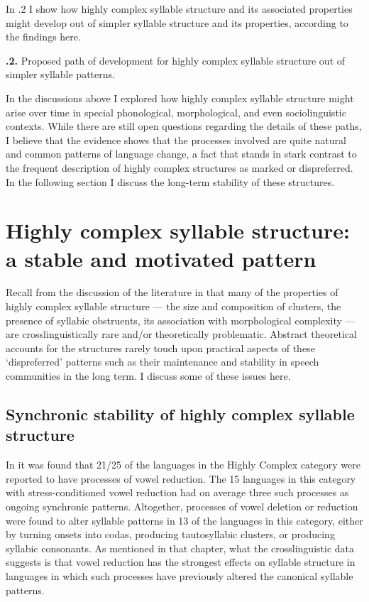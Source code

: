   In .2 I show how highly complex syllable structure and its associated properties might develop out of simpler syllable structure and its properties, according to the findings here.


\textbf{.2.} Proposed path of development for highly complex syllable structure out of simpler syllable patterns.

  In the discussions above I explored how highly complex syllable structure might arise over time in special phonological, morphological, and even sociolinguistic contexts. While there are still open questions regarding the details of these paths, I believe that the evidence shows that the processes involved are quite natural and common patterns of language change, a fact that stands in stark contrast to the frequent description of highly complex structures as marked or dispreferred. In the following section I discuss the long-term stability of these structures.

\section{Highly complex syllable structure: a stable and motivated pattern}\label{sec:8.5}

  Recall from the discussion of the literature in  that many of the properties of highly complex syllable structure — the size and composition of clusters, the presence of syllabic obstruents, its association with morphological complexity — are crosslinguistically rare and/or theoretically problematic. Abstract theoretical accounts for the structures rarely touch upon practical aspects of these ‘dispreferred’ patterns such as their maintenance and stability in speech communities in the long term. I discuss some of these issues here.

\subsection{Synchronic stability of highly complex syllable structure}\label{sec:8.5.1}

  In  it was found that 21/25 of the languages in the Highly Complex category were reported to have processes of vowel reduction. The 15 languages in this category with stress-conditioned vowel reduction had on average three such processes as ongoing synchronic patterns. Altogether, processes of vowel deletion or reduction were found to alter syllable patterns in 13 of the languages in this category, either by turning onsets into codas, producing tautosyllabic clusters, or producing syllabic consonants. As mentioned in that chapter, what the crosslinguistic data suggests is that vowel reduction has the strongest effects on syllable structure in languages in which such processes have previously altered the canonical syllable patterns.

